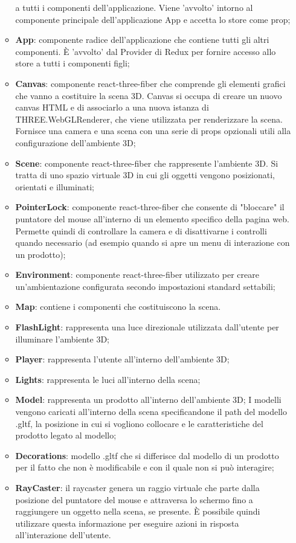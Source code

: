 \begin{itemize}
\begin{itemize}
			a tutti i componenti dell'applicazione. 
			Viene 'avvolto' intorno al componente principale dell'applicazione App e accetta lo store come prop; 
			\item \textbf{App}: componente radice dell'applicazione che contiene tutti gli altri componenti. 
			È 'avvolto' dal Provider di Redux per fornire accesso allo store a tutti i componenti figli;
			\item \textbf{Canvas}: componente react-three-fiber che comprende gli elementi grafici che vanno a costituire
			la scena 3D.
			Canvas si occupa di creare un nuovo canvas HTML e di associarlo a una nuova istanza di THREE.WebGLRenderer, 
			che viene utilizzata per renderizzare la scena.
			Fornisce una camera e una scena con una serie di props opzionali utili alla configurazione dell'ambiente 3D;
			\item \textbf{Scene}: componente react-three-fiber che rappresente l'ambiente 3D.
			Si tratta di uno spazio virtuale 3D in cui gli oggetti vengono posizionati, orientati e illuminati; 
			\item \textbf{PointerLock}: componente react-three-fiber che consente di "bloccare" il puntatore del mouse all'interno 
			di un elemento specifico della pagina web.
			Permette quindi di controllare la camera e di disattivarne i controlli quando 
			necessario (ad esempio quando si apre un menu di interazione con un prodotto);
			\item \textbf{Environment}: componente react-three-fiber utilizzato per creare un'ambientazione configurata
			secondo impostazioni standard settabili;
			\item \textbf{Map}: contiene i componenti che costituiscono la scena.
			\item \textbf{FlashLight}: rappresenta una luce direzionale utilizzata dall'utente per illuminare
			l'ambiente 3D;
			\item \textbf{Player}: rappresenta l'utente all'interno dell'ambiente 3D;
			\item \textbf{Lights}: rappresenta le luci all'interno della scena;
			\item \textbf{Model}: rappresenta un prodotto all'interno dell'ambiente 3D;
			I modelli vengono caricati all'interno della scena specificandone il path del modello .gltf, la posizione
			in cui si vogliono collocare e le caratteristiche del prodotto legato al modello;
			\item \textbf{Decorations}: modello .gltf che si differisce dal modello di un prodotto 
			per il fatto che non è modificabile e con il quale non si può interagire;
			\item \textbf{RayCaster}: 
			il raycaster genera un raggio virtuale che parte dalla posizione del puntatore del mouse e attraversa lo schermo fino a 
			raggiungere un oggetto nella scena, se presente. 
			È possibile quindi utilizzare questa informazione per eseguire azioni in risposta all'interazione dell'utente.
		\end{itemize}
\end{itemize}
